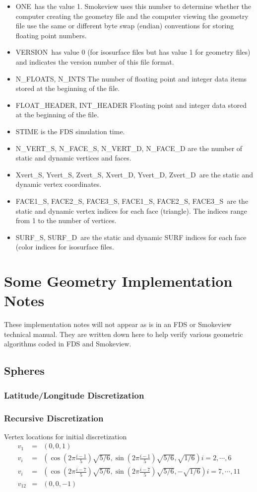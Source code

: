 \documentclass[12pt]{article}
\begin{document}
\begin{itemize}
\item {\ct ONE}\ has the value 1. Smokeview uses this number to determine whether the computer creating the geometry file and the computer viewing the geometry file use the same or different byte swap (endian) conventions for storing floating point numbers.
\item {\ct VERSION}\ has value 0 (for isosurface files but has value 1 for geometry files) and indicates the version number of this file format.
\item {\ct N\_FLOATS, N\_INTS} The number of floating point and integer data items stored at the beginning of the file.
\item {\ct FLOAT\_HEADER, INT\_HEADER} Floating point and integer data stored at the beginning of the file.
\item {\ct STIME} is the FDS simulation time.
\item {\ct N\_VERT\_S, N\_FACE\_S, N\_VERT\_D, N\_FACE\_D} are the number of static and dynamic vertices and faces.
\item {\ct Xvert\_S, Yvert\_S, Zvert\_S, Xvert\_D, Yvert\_D, Zvert\_D}\ are the static and dynamic vertex coordinates.
\item {\ct FACE1\_S, FACE2\_S, FACE3\_S, FACE1\_S, FACE2\_S, FACE3\_S}\ are the static and dynamic vertex indices for each face (triangle).
    The indices range from 1 to the number of vertices.
\item {\ct SURF\_S, SURF\_D}\ are the static and dynamic SURF indices for each face (color indices for isosurface files.
\end{itemize}

\section{Some Geometry Implementation Notes}
These implementation notes will not appear as is in an FDS or Smokeview technical manual. They are written down here to help verify various geometric algorithms coded in FDS and Smokeview.

\subsection{Spheres}
\subsubsection{Latitude/Longitude Discretization}
\subsubsection{Recursive Discretization}
Vertex locations for initial discretization
\begin{eqnarray*}
v_1&=&(0,0,1)\\
v_i&=&\left(\cos\left(2\pi\frac{i-1}{5}\right)\sqrt{5/6},\sin\left(2\pi\frac{i-1}{5}\right)\sqrt{5/6},\sqrt{1/6}\right)i=2,\cdots, 6\\
v_i&=&\left(\cos\left(2\pi\frac{i-7}{5}\right)\sqrt{5/6},\sin\left(2\pi\frac{i-7}{5}\right)\sqrt{5/6},-\sqrt{1/6}\right)i=7,\cdots, 11\\
v_{12}&=&(0,0,-1)
\end{eqnarray*}
\end{document}
